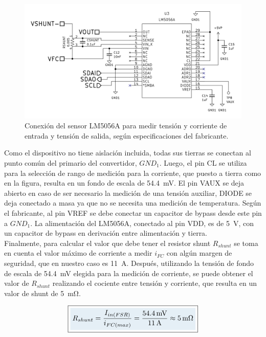 \begin{figure}[h]
    \centering
    \includegraphics[scale=0.22]{Imagenes/Conexion LM5056A.png}
    \caption{Conexión del sensor LM5056A para medir tensión y corriente de entrada y tensión de salida, según especificaciones del fabricante.}
    \label{conexion_LM5056A}
\end{figure}

Como el dispositivo no tiene aislación incluida, todas sus tierras se conectan al punto común del primario del convertidor, $GND_1$. Luego, el pin CL se utiliza para la selección de rango de medición para la corriente, que puesto a tierra como en la figura, resulta en un fondo de escala de \SI[]{54.4}[]{\milli\volt}. El pin VAUX se deja abierto en caso de ser necesario la medición de una tensión auxiliar, DIODE se deja conectado a masa ya que no se necesita una medición de temperatura. Según el fabricante, al pin VREF se debe conectar un capacitor de bypass desde este pin a $GND_1$. La alimentación del LM5056A, conectado al pin VDD, es de \SI[]{5}[]{\volt}, con un capacitor de bypass en derivación entre alimentación y tierra.\\

Finalmente, para calcular el valor que debe tener el resistor shunt $R_{shunt}$ se toma en cuenta el valor máximo de corriente a medir $i_{FC}$ con algún margen de seguridad, que en nuestro caso es \SI[]{11}[]{\ampere}. Después, utilizando la tensión de fondo de escala de \SI[]{54.4}[]{\milli\volt} elegida para la medición de corriente, se puede obtener el valor de $R_{shunt}$ realizando el cociente entre tensión y corriente, que resulta en un valor de shunt de \SI[]{5}[]{\milli\ohm}.

\begin{equation}\label{calcullo_shunt}
    \boxed{\highlight{
    R_{shunt} = \frac{I_{in(FSR)}}{i_{FC(max)}} = \frac{\SI{54.4}{\milli\volt}}{\SI{11}{\ampere}} \approx \SI[]{5}[]{\milli\ohm}
    }}
\end{equation}

